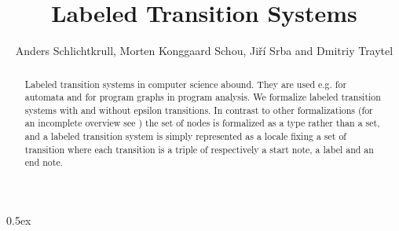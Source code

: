 \documentclass[10pt,a4paper]{article}
\begin{document}
\title{Labeled Transition Systems}
\author{Anders Schlichtkrull, Morten Konggaard Schou, Ji\v{r}\'i Srba and Dmitriy Traytel}
\date{}

\maketitle

\begin{abstract}
\noindent
Labeled transition systems in computer science abound. They are used e.g. for automata and for program graphs in program analysis.
We formalize labeled transition systems with and without epsilon transitions.
In contrast to other formalizations (for an incomplete overview see \cite{graphs}) the set of nodes is formalized as a type rather than a set,
and a labeled transition system is simply represented as a locale fixing a set of transition where each transition is a triple of respectively a start note, a label and an end note.

\end{abstract}

\tableofcontents

\newpage

\parindent 0pt
\parskip 0.5ex

\newpage





\end{document}
